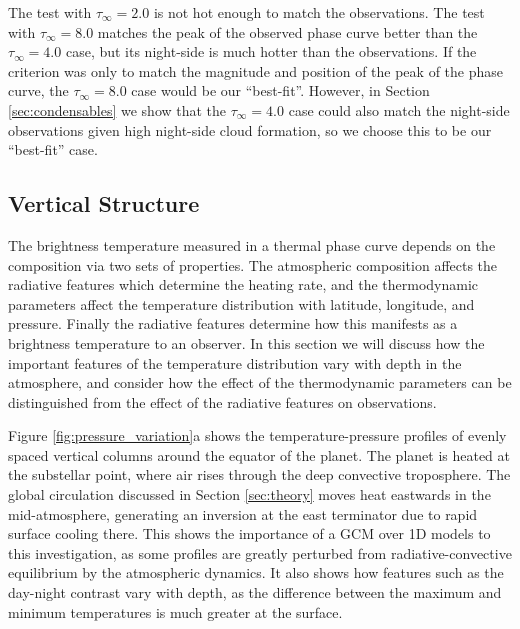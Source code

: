 The test with $\tau_{\infty} = 2.0$ is not hot enough to match the observations. The test with $\tau_{\infty} = 8.0$ matches the peak of the observed phase curve better than the $\tau_{\infty} = 4.0$ case, but its night-side is much hotter than the observations. If the criterion was only to match the magnitude and position of the peak of the phase curve, the $\tau_{\infty} = 8.0$ case would be our ``best-fit''. However, in Section \ref{sec:condensables} we show that the $\tau_{\infty} = 4.0$ case could also match the night-side observations given high night-side cloud formation, so we choose this to be our ``best-fit'' case.

\subsection{Vertical Structure}\label{sec:vertical_structure}



The brightness temperature measured in a thermal phase curve depends on the composition via two sets of properties. The atmospheric composition affects the radiative features which determine the heating rate, and the thermodynamic parameters affect the temperature distribution with latitude, longitude, and pressure. Finally the radiative features determine how this manifests as a brightness temperature to an observer. In this section we will discuss how the important features of the temperature distribution vary with depth in the atmosphere, and consider how the effect of the thermodynamic parameters can be distinguished from the effect of the radiative features on observations.

Figure \ref{fig:pressure_variation}a shows the temperature-pressure profiles of evenly spaced vertical columns around the equator of the planet. The planet is heated at the substellar point, where air rises through the deep convective troposphere. The global circulation discussed in Section \ref{sec:theory} moves heat eastwards in the mid-atmosphere, generating an inversion at the east terminator due to rapid surface cooling there. This shows the importance of a GCM over 1D models to this investigation, as some profiles are greatly perturbed from radiative-convective equilibrium by the atmospheric dynamics. It also shows how features such as the day-night contrast vary with depth, as the difference between the maximum and minimum temperatures is much greater at the surface.


